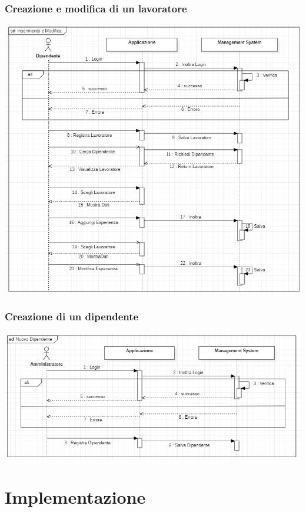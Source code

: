 \documentclass[ 4paper,11pt,openany]{book}
\begin{document}
\subsection{Creazione e modifica di un lavoratore}
\includegraphics[width=180mm]{seq.png}
\subsection{Creazione di un dipendente}
\includegraphics[width=180mm]{seq2.png}


\chapter{Implementazione}%
\end{document}
